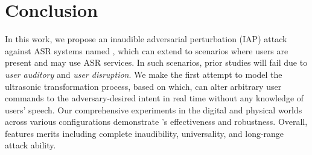 \section{Conclusion}
In this work, we propose an inaudible adversarial perturbation (IAP) attack against ASR systems named \alias, which can extend to scenarios where users are present and may use ASR services. In such scenarios, prior studies will fail due to \textit{user auditory} and \textit{user disruption}. 
We make the first attempt to model the ultrasonic transformation process, based on which, \alias can alter arbitrary user commands to the adversary-desired intent in real time without any knowledge of users' speech. Our comprehensive experiments in the digital and physical worlds across various configurations demonstrate \alias's effectiveness and robustness. Overall, \alias features merits including complete inaudibility, universality, and long-range attack ability.
